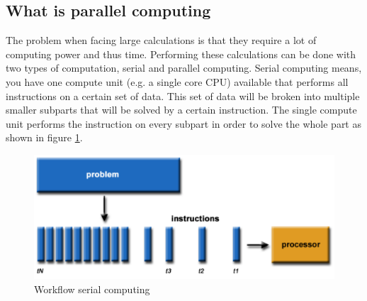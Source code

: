 \documentclass[a4paper, 11pt]{report}
\begin{document}
	\subsection{What is parallel computing}
The problem when facing large calculations is that they require a lot of computing power and thus time. Performing these calculations can be done with two types of computation, serial and parallel computing. Serial computing means, you have one compute unit (e.g. a single core CPU) available that performs all instructions on a certain set of data. This set of data will be broken into multiple smaller subparts that will be solved by a certain instruction. The single compute unit performs the instruction on every subpart in order to solve the whole part as shown in figure \ref{fig:SerialC}.
	\begin{figure}[ht]
		\centering
		\includegraphics[scale=.4]{images/serialProblem.pdf}
		\caption{Workflow serial computing}
		\label{fig:SerialC}
	\end{figure}
\end{document}
